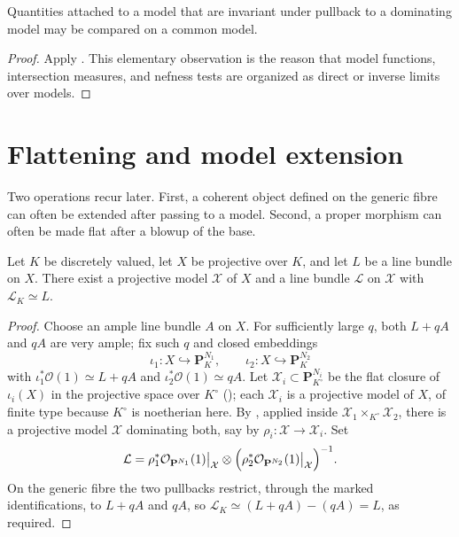 \begin{corollary}
\label{cor:common-model-comparison}
Quantities attached to a model that are invariant under pullback to a
dominating model may be compared on a common model.
\end{corollary}
\begin{proof}
Apply . This elementary observation is
the reason that model functions, intersection measures, and nefness tests are
organized as direct or inverse limits over models.
\end{proof}

\section{Flattening and model extension}

Two operations recur later. First, a coherent object defined on the generic
fibre can often be extended after passing to a model. Second, a proper
morphism can often be made flat after a blowup of the base.

\begin{proposition}\label{prop:line-bundle-extension}
Let $K$ be discretely valued, let $X$ be projective over $K$, and let $L$ be a
line bundle on $X$. There exist a projective model $\mathcal X$ of $X$ and
a line bundle $\mathcal L$ on $\mathcal X$ with
$\mathcal L_K\simeq L$.
\end{proposition}
\begin{proof}
Choose an ample line bundle $A$ on $X$.  For sufficiently large $q$, both
$L+qA$ and $qA$ are very ample; fix such $q$ and closed
embeddings
\[
      \iota_1:X\hookrightarrow\mathbf P^{N_1}_K,
      \qquad
      \iota_2:X\hookrightarrow\mathbf P^{N_2}_K
\]
with $\iota_1^*\mathcal O(1)\simeq L+qA$ and
$\iota_2^*\mathcal O(1)\simeq qA$.  Let
$\mathcal X_i\subset\mathbf P^{N_i}_{K^\circ}$ be the flat closure of
$\iota_i(X)$ in the projective space over $K^\circ$
(); each $\mathcal X_i$ is a
projective model of $X$, of finite type because $K^\circ$ is noetherian
here.  By , applied inside
$\mathcal X_1\times_{K^\circ}\mathcal X_2$, there is a projective model
$\mathcal X$ dominating both, say by
$\rho_i:\mathcal X\to\mathcal X_i$.  Set
\[
   \mathcal L
   =\rho_1^*\mathcal O_{\mathbf P^{N_1}}(1)\big|_{\mathcal X}
   \otimes
   \Bigl(\rho_2^*\mathcal O_{\mathbf P^{N_2}}(1)\big|_{\mathcal X}\Bigr)^{-1}.
\]
On the generic fibre the two pullbacks restrict, through the marked
identifications, to $L+qA$ and $qA$, so
$\mathcal L_K\simeq(L+qA)-(qA)=L$, as required.
\end{proof}

